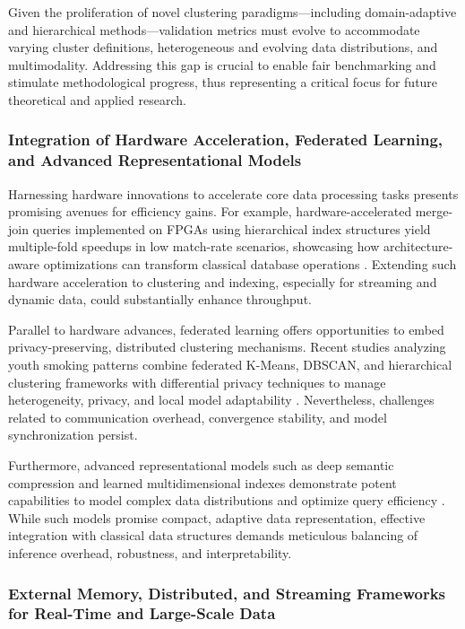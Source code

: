 \documentclass[11pt]{article}
\begin{document}
Given the proliferation of novel clustering paradigms—including domain-adaptive and hierarchical methods—validation metrics must evolve to accommodate varying cluster definitions, heterogeneous and evolving data distributions, and multimodality. Addressing this gap is crucial to enable fair benchmarking and stimulate methodological progress, thus representing a critical focus for future theoretical and applied research.

\subsubsection{Integration of Hardware Acceleration, Federated Learning, and Advanced Representational Models}

Harnessing hardware innovations to accelerate core data processing tasks presents promising avenues for efficiency gains. For example, hardware-accelerated merge-join queries implemented on FPGAs using hierarchical index structures yield multiple-fold speedups in low match-rate scenarios, showcasing how architecture-aware optimizations can transform classical database operations \cite{ref27}. Extending such hardware acceleration to clustering and indexing, especially for streaming and dynamic data, could substantially enhance throughput.

Parallel to hardware advances, federated learning offers opportunities to embed privacy-preserving, distributed clustering mechanisms. Recent studies analyzing youth smoking patterns combine federated K-Means, DBSCAN, and hierarchical clustering frameworks with differential privacy techniques to manage heterogeneity, privacy, and local model adaptability \cite{ref25}. Nevertheless, challenges related to communication overhead, convergence stability, and model synchronization persist.

Furthermore, advanced representational models such as deep semantic compression and learned multidimensional indexes demonstrate potent capabilities to model complex data distributions and optimize query efficiency \cite{ref16, ref33}. While such models promise compact, adaptive data representation, effective integration with classical data structures demands meticulous balancing of inference overhead, robustness, and interpretability.

\subsubsection{External Memory, Distributed, and Streaming Frameworks for Real-Time and Large-Scale Data}
\end{document}
